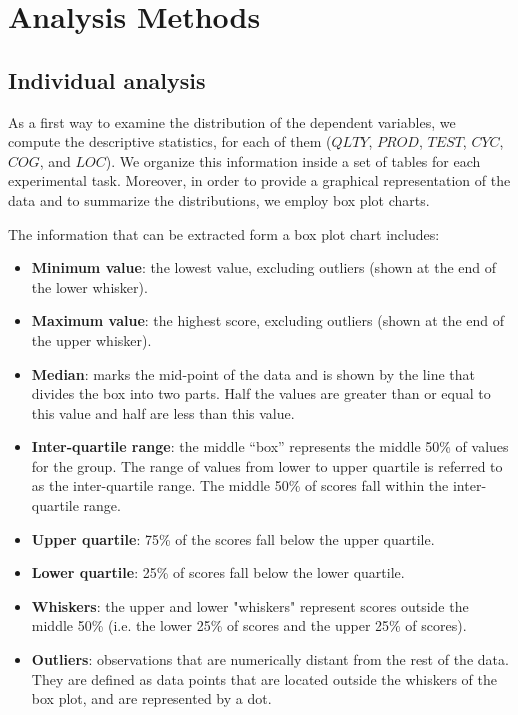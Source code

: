 \section{Analysis Methods}
\subsection{Individual analysis}
As a first way to examine the distribution of the dependent variables, we compute the descriptive statistics, for each of them (\ie $QLTY$, $PROD$, $TEST$, $CYC$, $COG$, and $LOC$). We organize this information inside a set of tables for each experimental task. Moreover, in order to provide a graphical representation of the data and to summarize the distributions, we employ box plot charts.

The information that can be extracted form a box plot chart includes:
\begin{itemize}
    \item \textbf{Minimum value}: the lowest value, excluding outliers (shown at the end of the lower whisker).
    \item \textbf{Maximum value}: the highest score, excluding outliers (shown at the end of the upper whisker).
    \item \textbf{Median}: marks the mid-point of the data and is shown by the line that divides the box into two parts. Half the values are greater than or equal to this value and half are less than this value.
    \item \textbf{Inter-quartile range}: the middle “box” represents the middle 50\% of values for the group. The range of values from lower to upper quartile is referred to as the inter-quartile range. The middle 50\% of scores fall within the inter-quartile range.
    \item \textbf{Upper quartile}: 75\% of the scores fall below the upper quartile.
    \item \textbf{Lower quartile}: 25\% of scores fall below the lower quartile.
    \item \textbf{Whiskers}: the upper and lower "whiskers" represent scores outside the middle 50\% (i.e. the lower 25\% of scores and the upper 25\% of scores).
    \item \textbf{Outliers}: observations that are numerically distant from the rest of the data. They are defined as data points that are located outside the whiskers of the box plot, and are represented by a dot.
\end{itemize}


